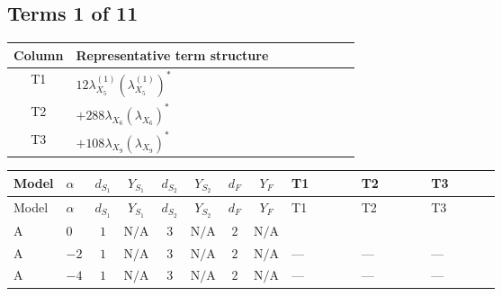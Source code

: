 \documentclass[8pt]{article}
\begin{document}
\begin{landscape}
\subsection*{Terms 1 of 11}
\begin{center}
\begin{tabular}{@{}c >{\raggedright\arraybackslash}p{0.82\linewidth}@{}}
\toprule
Column & Representative term structure \\
\midrule
T1 & \(\displaystyle 12 {\lambda_{X_{5}}^{(1)}} \left({\lambda_{X_{5}}^{(1)}}\right)^{*}\) \\
\midrule
T2 & \(\displaystyle +288 {\lambda_{X_{6}}} \left({\lambda_{X_{6}}}\right)^{*}\) \\
\midrule
T3 & \(\displaystyle +108 {\lambda_{X_{9}}} \left({\lambda_{X_{9}}}\right)^{*}\) \\
\midrule
\bottomrule
\end{tabular}
\end{center}
\smallskip
\tiny
\begin{longtable}{@{}llcccccc >{\raggedright\arraybackslash}p{0.21\linewidth} >{\raggedright\arraybackslash}p{0.21\linewidth} >{\raggedright\arraybackslash}p{0.21\linewidth}@{}}
\toprule
Model & $\alpha$ & $d_{S_1}$ & $Y_{S_1}$ & $d_{S_2}$ & $Y_{S_2}$ & $d_F$ & $Y_F$ & T1 & T2 & T3 \\
\midrule
\endfirsthead
\toprule
Model & $\alpha$ & $d_{S_1}$ & $Y_{S_1}$ & $d_{S_2}$ & $Y_{S_2}$ & $d_F$ & $Y_F$ & T1 & T2 & T3 \\
\midrule
\endhead
A & $0$ & $1$ & $\text{N/A}$ & $3$ & $\text{N/A}$ & $2$ & $\text{N/A}$ & \scriptsize\adjustbox{max width=\linewidth}{$\begin{gathered} 12 {\lambda_{X_{5}}^{(1)}} \left({\lambda_{X_{5}}^{(1)}}\right)^{*}\end{gathered}$} & \scriptsize\adjustbox{max width=\linewidth}{$\begin{gathered} +288 {\lambda_{X_{6}}} \left({\lambda_{X_{6}}}\right)^{*}\end{gathered}$} & \scriptsize\adjustbox{max width=\linewidth}{$\begin{gathered} +108 {\lambda_{X_{9}}} \left({\lambda_{X_{9}}}\right)^{*}\end{gathered}$} \\
\midrule
A & $-2$ & $1$ & $\text{N/A}$ & $3$ & $\text{N/A}$ & $2$ & $\text{N/A}$ & --- & --- & --- \\
\midrule
A & $-4$ & $1$ & $\text{N/A}$ & $3$ & $\text{N/A}$ & $2$ & $\text{N/A}$ & --- & --- & --- \\

\end{longtable}
\end{landscape}
\end{document}
